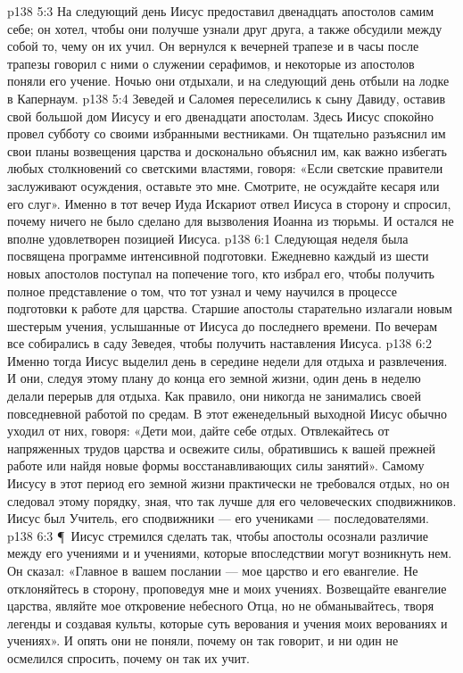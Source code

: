 \vs p138 5:3 На следующий день Иисус предоставил двенадцать апостолов самим себе; он хотел, чтобы они получше узнали друг друга, а также обсудили между собой то, чему он их учил. Он вернулся к вечерней трапезе и в часы после трапезы говорил с ними о служении серафимов, и некоторые из апостолов поняли его учение. Ночью они отдыхали, и на следующий день отбыли на лодке в Капернаум.
\vs p138 5:4 Зеведей и Саломея переселились к сыну Давиду, оставив свой большой дом Иисусу и его двенадцати апостолам. Здесь Иисус спокойно провел субботу со своими избранными вестниками. Он тщательно разъяснил им свои планы возвещения царства и досконально объяснил им, как важно избегать любых столкновений со светскими властями, говоря: «Если светские правители заслуживают осуждения, оставьте это мне. Смотрите, не осуждайте кесаря или его слуг». Именно в тот вечер Иуда Искариот отвел Иисуса в сторону и спросил, почему ничего не было сделано для вызволения Иоанна из тюрьмы. И остался не вполне удовлетворен позицией Иисуса.
\vs p138 6:1 Следующая неделя была посвящена программе интенсивной подготовки. Ежедневно каждый из шести новых апостолов поступал на попечение того, кто избрал его, чтобы получить полное представление о том, что тот узнал и чему научился в процессе подготовки к работе для царства. Старшие апостолы старательно излагали новым шестерым учения, услышанные от Иисуса до последнего времени. По вечерам все собирались в саду Зеведея, чтобы получить наставления Иисуса.
\vs p138 6:2 Именно тогда Иисус выделил день в середине недели для отдыха и развлечения. И они, следуя этому плану до конца его земной жизни, один день в неделю делали перерыв для отдыха. Как правило, они никогда не занимались своей повседневной работой по средам. В этот еженедельный выходной Иисус обычно уходил от них, говоря: «Дети мои, дайте себе отдых. Отвлекайтесь от напряженных трудов царства и освежите силы, обратившись к вашей прежней работе или найдя новые формы восстанавливающих силы занятий». Самому Иисусу в этот период его земной жизни практически не требовался отдых, но он следовал этому порядку, зная, что так лучше для его человеческих сподвижников. Иисус был Учитель, его сподвижники --- его учениками --- последователями.
\vs p138 6:3 \P\ Иисус стремился сделать так, чтобы апостолы осознали различие между его учениями и  и учениями, которые впоследствии могут возникнуть  нем. Он сказал: «Главное в вашем послании --- мое царство и его евангелие. Не отклоняйтесь в сторону, проповедуя  мне и  моих учениях. Возвещайте евангелие царства, являйте мое откровение небесного Отца, но не обманывайтесь, творя легенды и создавая культы, которые суть верования и учения  моих верованиях и учениях». И опять они не поняли, почему он так говорит, и ни один не осмелился спросить, почему он так их учит.
